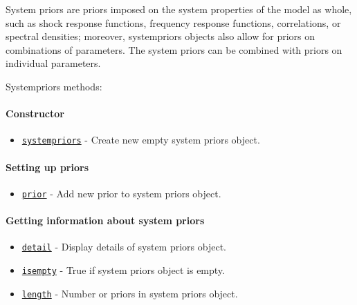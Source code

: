 

	System priors are priors imposed on the system properties of the model
as whole, such as shock response functions, frequency response
functions, correlations, or spectral densities; moreover, systempriors
objects also allow for priors on combinations of parameters. The system
priors can be combined with priors on individual parameters.

Systempriors methods:

\paragraph{Constructor}\label{constructor}

\begin{itemize}
\itemsep1pt\parskip0pt
\item
  \href{systempriors/systempriors}{\texttt{systempriors}} - Create new
  empty system priors object.
\end{itemize}

\paragraph{Setting up priors}\label{setting-up-priors}

\begin{itemize}
\itemsep1pt\parskip0pt
\item
  \href{systempriors/prior}{\texttt{prior}} - Add new prior to system
  priors object.
\end{itemize}

\paragraph{Getting information about system
priors}\label{getting-information-about-system-priors}

\begin{itemize}
\itemsep1pt\parskip0pt
\item
  \href{systempriors/detail}{\texttt{detail}} - Display details of
  system priors object.
\item
  \href{systempriors/isempty}{\texttt{isempty}} - True if system priors
  object is empty.
\item
  \href{systempriors/length}{\texttt{length}} - Number or priors in
  system priors object.
\end{itemize}



